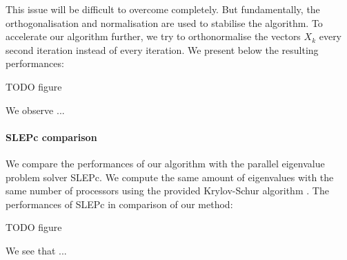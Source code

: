 This issue will be difficult to overcome completely.
But fundamentally, the orthogonalisation and normalisation are used to stabilise the algorithm.
To accelerate our algorithm further, we try to orthonormalise the vectors \(X_k\) every second iteration instead of every iteration.
We present below the resulting performances:

TODO figure
%  

We observe ...

\paragraph{SLEPc comparison}
We compare the performances of our algorithm with the parallel eigenvalue problem solver SLEPc.
We compute the same amount of eigenvalues with the same number of processors using the provided Krylov-Schur algorithm \cite{stewart_krylovschur_2002}.
The performances of SLEPc in comparison of our method:

TODO figure
%  

We see that ...
